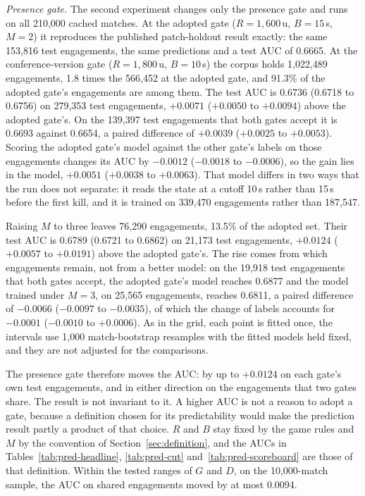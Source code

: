 \emph{Presence gate.} The second experiment changes only the presence gate and runs on all 210,000 cached
matches. At the adopted gate ($R = 1{,}600$\,u, $B = 15$\,s, $M = 2$) it reproduces the published
patch-holdout result exactly: the same 153,816 test engagements, the same predictions and a test AUC of
0.6665. At the conference-version gate ($R = 1{,}800$\,u, $B = 10$\,s) the corpus holds 1,022,489
engagements, 1.8 times the 566,452 at the adopted gate, and 91.3\% of the adopted gate's engagements are
among them. The test AUC is 0.6736 (0.6718 to 0.6756) on 279,353 test engagements, $+0.0071$ ($+0.0050$ to
$+0.0094$) above the adopted gate's. On the 139,397 test engagements that both gates accept it is 0.6693
against 0.6654, a paired difference of $+0.0039$ ($+0.0025$ to $+0.0053$). Scoring the adopted gate's model
against the other gate's labels on those engagements changes its AUC by $-0.0012$ ($-0.0018$ to $-0.0006$),
so the gain lies in the model, $+0.0051$ ($+0.0038$ to $+0.0063$). That model differs in two ways that the
run does not separate: it reads the state at a cutoff 10\,s rather than 15\,s before the first kill, and it
is trained on 339,470 engagements rather than 187,547.

Raising $M$ to three leaves 76,290 engagements, 13.5\% of the adopted set. Their test AUC is 0.6789 (0.6721
to 0.6862) on 21,173 test engagements, $+0.0124$ ($+0.0057$ to $+0.0191$) above the adopted gate's. The rise
comes from which engagements remain, not from a better model: on the 19,918 test engagements that both
gates accept, the adopted gate's model reaches 0.6877 and the model trained under $M = 3$, on 25,565
engagements, reaches 0.6811, a paired difference of $-0.0066$ ($-0.0097$ to $-0.0035$), of which the
change of labels accounts for $-0.0001$ ($-0.0010$ to $+0.0006$). As in the grid, each point is fitted
once, the intervals use 1,000 match-bootstrap resamples with the fitted models held fixed, and they are not
adjusted for the comparisons.

The presence gate therefore moves the AUC: by up to $+0.0124$ on each gate's own test engagements, and in
either direction on the engagements that two gates share. The result is not invariant to it. A higher AUC
is not a reason to adopt a gate, because a definition chosen for its predictability would make the
prediction result partly a product of that choice. $R$ and $B$ stay fixed by the game rules and $M$ by the
convention of Section~\ref{sec:definition}, and the AUCs in Tables~\ref{tab:pred-headline},
\ref{tab:pred-cut} and~\ref{tab:pred-scoreboard} are those of that definition. Within the tested
ranges of $G$ and $D$, on the 10,000-match sample, the AUC on shared engagements moved by at most 0.0094.
